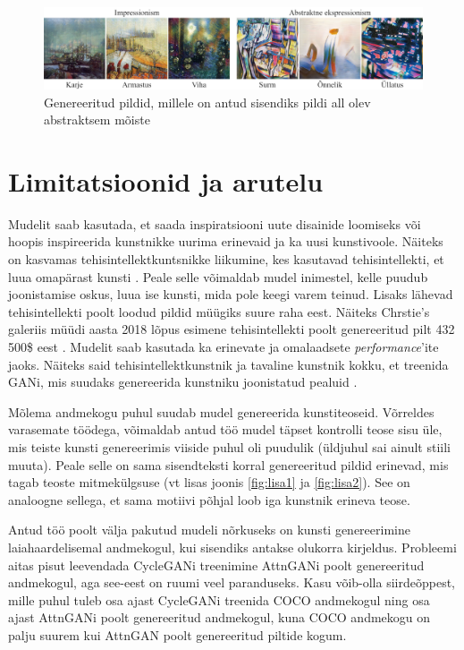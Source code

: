 \documentclass{vilgym}
\begin{document}
	\begin{figure}[ht]
		\includegraphics[width=\linewidth]{images/abstraktne.png}
		\caption{Genereeritud pildid, millele on antud sisendiks pildi all olev abstraktsem mõiste}
		\label{fig:abstract}
	\end{figure}

	\section{Limitatsioonid ja arutelu}

	Mudelit saab kasutada, et saada inspiratsiooni uute disainide loomiseks või hoopis inspireerida kunstnikke uurima erinevaid ja ka uusi kunstivoole. Näiteks on kasvamas tehisintellektkuntsnikke liikumine, kes kasutavad tehisintellekti, et luua omapärast kunsti \parencite{aiartist}. Peale selle võimaldab mudel inimestel, kelle puudub joonistamise oskus, luua ise kunsti, mida pole keegi varem teinud. Lisaks lähevad tehisintellekti poolt loodud pildid müügiks suure raha eest. Näiteks Chrstie's galeriis müüdi aasta 2018 lõpus esimene tehisintellekti poolt genereeritud pilt 432 500\$ eest \parencite{art_sold}. Mudelit saab kasutada ka erinevate ja omalaadsete \textit{performance}'ite jaoks. Näiteks said tehisintellektkunstnik ja tavaline kunstnik kokku, et treenida GANi, mis suudaks genereerida kunstniku joonistatud pealuid \parencite{skulls}.

	Mõlema andmekogu puhul suudab mudel genereerida kunstiteoseid. Võrreldes varasemate töödega, võimaldab antud töö mudel täpset kontrolli teose sisu üle, mis teiste kunsti genereerimis viiside puhul oli puudulik (üldjuhul sai ainult stiili muuta). Peale selle on sama sisendteksti korral genereeritud pildid erinevad, mis tagab teoste mitmekülgsuse (vt lisas joonis \ref{fig:lisa1} ja \ref{fig:lisa2}). See on analoogne sellega, et sama motiivi põhjal loob iga kunstnik erineva teose.

	Antud töö poolt välja pakutud mudeli nõrkuseks on kunsti genereerimine laiahaardelisemal andmekogul, kui sisendiks antakse olukorra kirjeldus. Probleemi aitas pisut leevendada CycleGANi treenimine AttnGANi poolt genereeritud andmekogul, aga see-eest on ruumi veel paranduseks. Kasu võib-olla siirdeõppest, mille puhul tuleb osa ajast CycleGANi treenida COCO andmekogul ning osa ajast AttnGANi poolt genereeritud andmekogul, kuna COCO andmekogu on palju suurem kui AttnGAN poolt genereeritud piltide kogum.
\end{document}
